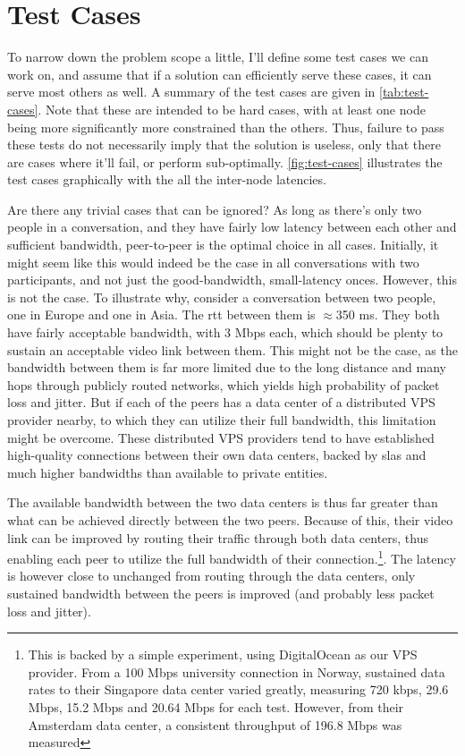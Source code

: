 \chapter{Test Cases}\label{chp:test-cases}

To narrow down the problem scope a little, I'll define some test cases we can work on, and assume that if a solution can efficiently serve these cases, it can serve most others as well. A summary of the test cases are given in \autoref{tab:test-cases}. Note that these are intended to be hard cases, with at least one node being more significantly more constrained than the others. Thus, failure to pass these tests do not necessarily imply that the solution is useless, only that there are cases where it'll fail, or perform sub-optimally. \autoref{fig:test-cases} illustrates the test cases graphically with the all the inter-node latencies.

Are there any trivial cases that can be ignored? As long as there's only two people in a conversation, and they have fairly low latency between each other and sufficient bandwidth, peer-to-peer is the optimal choice in all cases. Initially, it might seem like this would indeed be the case in all conversations with two participants, and not just the good-bandwidth, small-latency onces. However, this is not the case. To illustrate why, consider a conversation between two people, one in Europe and one in Asia. The \gls{rtt} between them is $\approx$350 ms. They both have fairly acceptable bandwidth, with 3 Mbps each, which should be plenty to sustain an acceptable video link between them. This might not be the case, as the bandwidth between them is far more limited due to the long distance and many hops through publicly routed networks, which yields high probability of packet loss and jitter. But if each of the peers has a data center of a distributed VPS provider nearby, to which they can utilize their full bandwidth, this limitation might be overcome. These distributed VPS providers tend to have established high-quality connections between their own data centers, backed by \glspl{sla} and much higher bandwidths than available to private entities.

The available bandwidth between the two data centers is thus far greater than what can be achieved directly between the two peers. Because of this, their video link can be improved by routing their traffic through both data centers, thus enabling each peer to utilize the full bandwidth of their connection.\footnote{This is backed by a simple experiment, using DigitalOcean as our VPS provider. From a 100 Mbps university connection in Norway, sustained data rates to their Singapore data center varied greatly, measuring 720 kbps, 29.6 Mbps, 15.2 Mbps and 20.64 Mbps for each test. However, from their Amsterdam data center, a consistent throughput of 196.8 Mbps was measured}. The latency is however close to unchanged from routing through the data centers, only sustained bandwidth between the peers is improved (and probably less packet loss and jitter).

